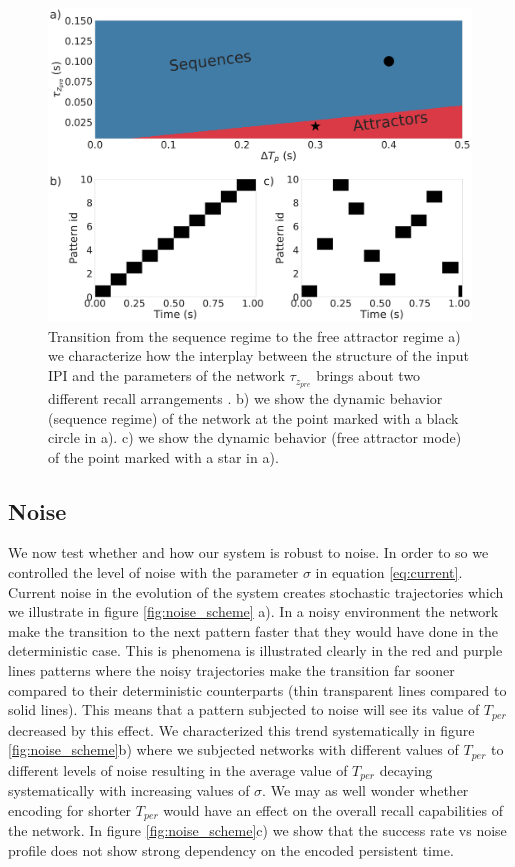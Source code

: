 \documentclass[10pt,a4paper]{article}
\begin{document}
\begin{figure}[H]
\centering
\includegraphics[scale=0.20]{attractor_vs_sequence.pdf}
\caption{Transition from the sequence regime to the free attractor regime a) we characterize how the interplay between the structure of the input IPI and the parameters of the network $\tau_{z_{pre}}$ brings about two different recall arrangements . b) we show the dynamic behavior (sequence regime) of the network at the point marked with a black circle in a). c) we show the dynamic behavior (free attractor mode) of the point marked with a star in a).}
\label{fig:attractors}
\end{figure}

\subsection{Noise}

We now test whether and how our system is robust to noise. In order to so we controlled the level of noise with the parameter $\sigma$ in equation \ref{eq:current}. Current noise in the evolution of the system creates stochastic trajectories which we illustrate in figure \ref{fig:noise_scheme} a). In a noisy environment the network make the transition to the next pattern faster that they would have done in the deterministic case. This is phenomena is illustrated clearly in the red and purple lines patterns where the noisy trajectories make the transition far sooner compared to their deterministic counterparts (thin transparent lines compared to solid lines). This means that a pattern subjected to noise will see its value of $T_{per}$ decreased by this effect. We characterized this trend systematically in figure \ref{fig:noise_scheme}b) where we subjected networks with different values of $T_{per}$ to different levels of noise resulting in the average value of $T_{per}$ decaying systematically with increasing values of $\sigma$. We may as well wonder whether encoding for shorter $T_{per}$ would have an effect on the overall recall capabilities of the network. In figure \ref{fig:noise_scheme}c) we show that the success rate vs noise profile does not show strong dependency on the encoded persistent time.  
\end{document}
